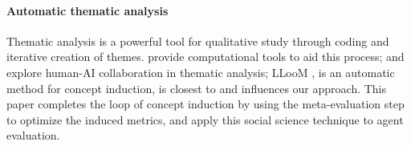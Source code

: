 \paragraph{Automatic thematic analysis}
Thematic analysis is a powerful tool for qualitative study through coding and
iterative creation of themes. \citet{gauthier2022computational} provide
computational tools to aid this process; \citet{hong2022scholastic} and \citet{gebreegziabher2023patat}
explore human-AI collaboration in thematic analysis; LLooM \citep{lam2024concept},
is an automatic method for concept induction, is closest to and influences our approach.
This paper completes the loop of concept induction by using the meta-evaluation
step to optimize the induced metrics, and apply this social science technique to
agent evaluation.